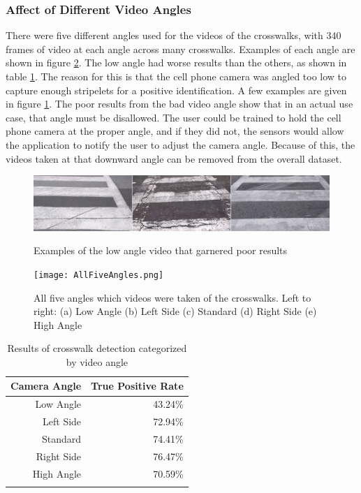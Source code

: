 \documentclass[12pt]{ucthesis}
\newcommand{\captionfonts}{\small\bf\ssp}
\begin{document}
\subsubsection{Affect of Different Video Angles}

There were five different angles used for the videos of the crosswalks, with 340 frames of video at each angle across many crosswalks. Examples of each angle are shown in figure \ref{fig:AllFiveAngles}. The low angle had worse results than the others, as shown in table \ref{tab:downbad}. The reason for this is that the cell phone camera was angled too low to capture enough stripelets for a positive identification. A few examples are given in figure \ref{fig:downBadPic}. The poor results from the bad video angle show that in an actual use case, that angle must be disallowed. The user could be trained to hold the cell phone camera at the proper angle, and if they did not, the sensors would allow the application to notify the user to adjust the camera angle. Because of this, the videos taken at that downward angle can be removed from the overall dataset. 

\begin{figure}[H]
\begin{center}
\includegraphics[width=15cm]{DownBad.png}
\captionfonts
\caption[Low Angle Video Examples]{Examples of the low angle video that garnered poor results}
\label{fig:downBadPic}
\end{center}
\end{figure}

\begin{figure}[H]
\begin{center}
\texttt{[image: AllFiveAngles.png]}
\captionfonts
\caption[All Five Different Crosswalk Angles]{All five angles which videos were taken of the crosswalks. Left to right: (a) Low Angle (b) Left Side (c) Standard (d) Right Side (e) High Angle}
\label{fig:AllFiveAngles}
\end{center}
\end{figure}

\begin{center}
    \begin{longtable}{| r | r |}
    \hline
    Camera Angle & True Positive Rate \bigstrut\\
    \hline
    Low Angle & 43.24\% \bigstrut\\
    \hline
    Left Side & 72.94\% \bigstrut\\
    \hline
    Standard & 74.41\% \bigstrut\\
    \hline
    Right Side & 76.47\% \bigstrut\\
    \hline
    High Angle & 70.59\% \bigstrut\\
    \hline

    \caption{Results of crosswalk detection categorized by video angle}
    \label{tab:downbad} 
    \end{longtable}
\end{center}
\end{document}

